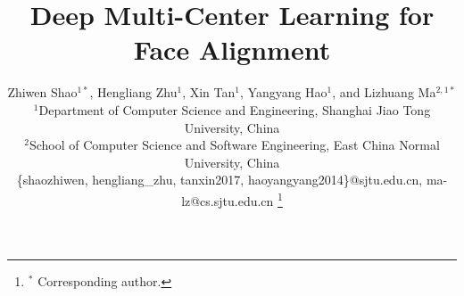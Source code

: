 \documentclass[journal]{IEEEtran}
\begin{document}
%
\title{Deep Multi-Center Learning for Face Alignment}
%
%
%

\author{Zhiwen Shao$^{1*}$, Hengliang Zhu$^1$, Xin Tan$^1$, Yangyang Hao$^1$, and Lizhuang Ma$^{2,1*}$
\\$^1$Department of Computer Science and Engineering, Shanghai Jiao Tong University, China
\\$^2$School of Computer Science and Software Engineering, East China Normal University, China
\\\{shaozhiwen, hengliang\_zhu, tanxin2017, haoyangyang2014\}@sjtu.edu.cn, ma-lz@cs.sjtu.edu.cn
\thanks{$^*$ Corresponding author.}}
%
%

%
\end{document}
